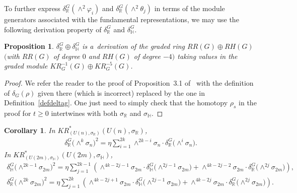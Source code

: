 \documentclass[pdftex]{sigma}
\numberwithin{equation}{section}
\newtheorem{Corollary}[Theorem]{Corollary}
\newtheorem{Proposition}[Theorem]{Proposition}
{\theoremstyle{definition}
\newtheorem{Definition}[Theorem]{Definition}
\newtheorem{Example}[Theorem]{Example}
\newtheorem{Remark}[Theorem]{Remark}
}
\begin{document}
To further express $\delta_\mathbb{R}^G(\wedge^2\varphi_i)$ and $\delta_\mathbb{R}^G(\wedge^2\theta_j)$ in terms of the
module generators associated with the fundamental representations, we may use the following derivation property of
$\delta_\mathbb{R}^G$ and $\delta_\mathbb{H}^G$.
\begin{Proposition}
\label{eqderivative}
$\delta_\mathbb{R}^G\oplus\delta_\mathbb{H}^G$ is a~derivation of the graded ring $RR(G)\oplus RH(G)$ $($with $RR(G)$ of
degree $0$ and $RH(G)$ of degree $-4)$ taking values in the graded module $KR^{-1}_G(G)\oplus KR^{-5}_G(G)$.
\end{Proposition}
\begin{proof}
We refer the reader to the proof of Proposition~3.1 of~\cite{BZ}
with the def\/inition of $\delta_G(\rho)$ given there
(which is incorrect) replaced by the one in Def\/inition~\ref{defdeltag}.
One just need to simply check that the homotopy $\rho_s$ in the proof for $t\geq 0$ intertwines with both $\sigma_\mathbb{R}$ and $\sigma_\mathbb{H}$.
\end{proof}
\begin{Corollary}
\label{krringunitary}
In $KR^*_{(U(n),
\sigma_\mathbb{R})}(U(n),
\sigma_\mathbb{R})$,
\begin{gather*}
\delta_\mathbb{R}^G\big({\wedge}^k
\sigma_n\big)^2=\eta\sum\limits_{i=1}^{2k}\wedge^{2k-i}
\sigma_n\cdot\delta_\mathbb{R}^G\big({\wedge}^i
\sigma_n\big).
\end{gather*}
In $KR^*_{(U(2m),
\sigma_\mathbb{H})}(U(2m),
\sigma_\mathbb{H})$,
\begin{gather*}
\delta_\mathbb{H}^G\big({\wedge}^{2k-1}\sigma_{2m}\big)^2=\eta\sum\limits_{j=1}^{2k-1}\left(\wedge^{4k-2j-1}
\sigma_{2m}\cdot\delta_\mathbb{H}^G\big({\wedge}^{2j-1}\sigma_{2m}\big)+\wedge^{4k-2j-2}\sigma_{2m}
\cdot\delta_\mathbb{R}^G\big({\wedge}^{2j}\sigma_{2m}\big)\right),
\\
\delta_\mathbb{R}^G\big({\wedge}^{2k}\sigma_{2m}\big)^2=\eta\sum\limits_{j=1}^{2k}\left(\wedge^{4k-2j+1}
\sigma_{2m}\cdot\delta_\mathbb{H}^G\big({\wedge}^{2j-1}\sigma_{2m}\big)+\wedge^{4k-2j}\sigma_{2m}
\cdot\delta_\mathbb{R}^G\big({\wedge}^{2j}\sigma_{2m}\big)\right).
\end{gather*}
\end{Corollary}
\end{document}
